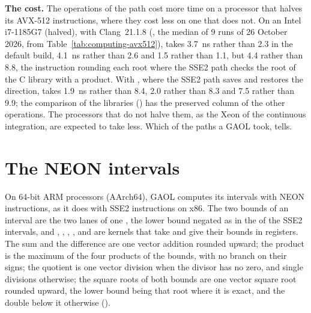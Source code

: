 \documentclass[12pt,a4paper,twoside,openright]{book}
\begin{document}
\medskip
\noindent
\textbf{The cost.} The operations of the path cost more time on a processor
that halves its AVX-512 instructions, where they cost less on one that does
not. On an Intel i7-1185G7 (halved), with Clang~21.1.8
(, the median of 9 runs of 26 October 2026, from
Table~\ref{tab:computing-avx512}),  takes
3.7~ns rather than 2.3 in the default build,  4.1~ns rather than
2.6 and  1.5 rather than 1.1, but  4.4 rather than
8.8, the instruction rounding each root where the SSE2 path checks the root
of the C library with a product. With , where
the SSE2 path saves and restores the direction,  takes 1.9~ns
rather than 8.4,  2.0 rather than 8.3 and  7.5
rather than 9.9; the comparison of the libraries () has
the preserved column of the other operations. The processors that do not
halve them, as the Xeon of the continuous integration, are expected to take
less. Which of the paths a GAOL took,
 tells.

\section{The NEON intervals}\label{sec:neon}
%

On 64-bit ARM processors (AArch64), GAOL computes its intervals with NEON
instructions, as it does with SSE2 instructions on x86.\newinvfive{} The two
bounds of an interval are the two lanes of one , the lower
bound negated as in the  of the SSE2 intervals, and \code{+},
\code{-}, \code{*}, \code{/},  and  are kernels that
take and give their bounds in registers. The sum and the difference are one
vector addition rounded upward; the product is the maximum of the four
products of the bounds, with no branch on their signs; the quotient is one
vector division when the divisor has no zero, and single divisions otherwise;
the square roots of both bounds are one vector square root rounded upward,
the lower bound being that root where it is exact, and the double below it
otherwise ().
\end{document}
